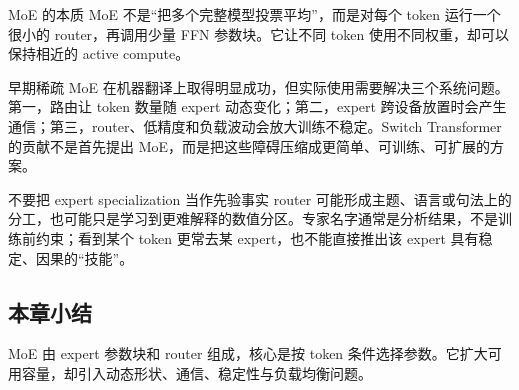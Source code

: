 \begin{importantbox}{MoE 的本质}
MoE 不是“把多个完整模型投票平均”，而是对每个 token 运行一个很小的 router，再调用少量 FFN 参数块。它让不同 token 使用不同权重，却可以保持相近的 active compute。
\end{importantbox}


早期稀疏 MoE 在机器翻译上取得明显成功，但实际使用需要解决三个系统问题。第一，路由让 token 数量随 expert 动态变化；第二，expert 跨设备放置时会产生通信；第三，router、低精度和负载波动会放大训练不稳定。Switch Transformer 的贡献不是首先提出 MoE，而是把这些障碍压缩成更简单、可训练、可扩展的方案。


\begin{warningbox}{不要把 expert specialization 当作先验事实}
router 可能形成主题、语言或句法上的分工，也可能只是学习到更难解释的数值分区。专家名字通常是分析结果，不是训练前约束；看到某个 token 更常去某 expert，也不能直接推出该 expert 具有稳定、因果的“技能”。
\end{warningbox}

\subsection{本章小结}

MoE 由 expert 参数块和 router 组成，核心是按 token 条件选择参数。它扩大可用容量，却引入动态形状、通信、稳定性与负载均衡问题。

